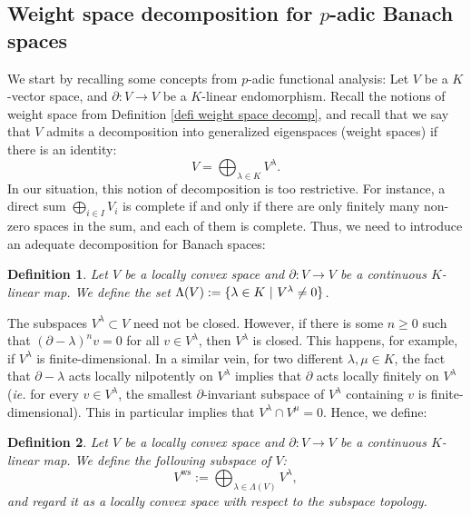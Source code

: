 \documentclass{amsart}
\newtheorem{defi}{ Definition}[subsection]
\begin{document}
\subsection{\texorpdfstring{Weight space decomposition for $p$-adic Banach spaces}{}}\label{Section decomposition into weight spaces}
We start by recalling some concepts from $p$-adic functional analysis: Let $V$ be a $K$-vector space, and $\partial:V\rightarrow V$ be a $K$-linear endomorphism. Recall the notions of weight space from Definition \ref{defi weight space decomp}, and recall that we say that $V$ admits a decomposition into generalized eigenspaces (weight spaces) if there is an identity:
\begin{equation*}
    V=\bigoplus_{\lambda\in K}V^{\lambda}.
\end{equation*}
In our situation, this notion of decomposition is too restrictive. For instance, a direct sum $\bigoplus_{i\in I}V_i$ is complete if and only if there are only finitely many non-zero spaces in the sum, and each of them is complete.
Thus, we need to introduce an  adequate decomposition for Banach spaces:
\begin{defi}\label{defin basic concepts ws decomposition}
Let $V$ be a locally convex space and $\partial:V\rightarrow V$ be a continuous $K$-linear map. We define the set $\Lambda(V):= \{ \lambda\in K \textnormal{ }\vert \textnormal{ } V^{\lambda}\neq 0 \}$.
\end{defi}
The subspaces $V^{\lambda}\subset V$ need not be closed. However, if there is some $n\geq 0$ such that $(\partial -\lambda)^nv=0$ for all $v\in V^{\lambda}$, then $V^{\lambda}$ is closed. This happens, for example, if $V^{\lambda}$ is finite-dimensional. In a similar vein, for two different $\lambda,\mu\in K$, the fact that $\partial -\lambda$ acts locally nilpotently on $V^{\lambda}$ implies that $\partial$ acts locally finitely on $V^{\lambda}$ (\emph{ie.} for every $v\in V^{\lambda}$, the smallest $\partial$-invariant subspace of $V^{\lambda}$ containing $v$ is finite-dimensional). This in particular implies that $V^{\lambda}\cap V^{\mu}=0$. Hence, we define:
\begin{defi}\label{defi ws functor}
Let $V$ be a locally convex space and $\partial:V\rightarrow V$ be a continuous $K$-linear map. 
We define the following subspace of $V$:
\begin{equation*}
    V^{\operatorname{ws}}:=\bigoplus_{\lambda \in \Lambda(V)}V^{\lambda},
\end{equation*}
and regard it as a locally convex space with respect to the subspace topology.
\end{defi}
\end{document}
